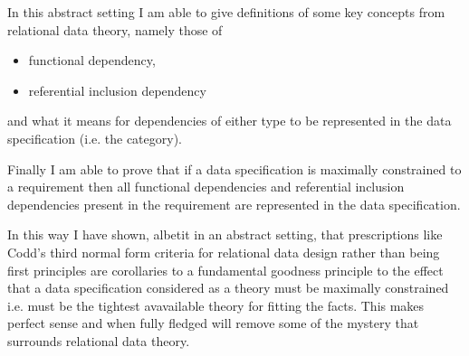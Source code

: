 \documentclass[10pt,a4paper]{article}
\theoremstyle{remark}
\begin{document}
In this abstract setting I am able to give definitions of some key concepts from relational data theory, namely
those of
\begin{itemize}
\item functional dependency,
\item referential inclusion dependency
\end{itemize}
and what it means for dependencies of either type to be represented in the data specification (i.e. the category).

Finally I am able to prove that if a data specification is maximally constrained to a requirement then
all functional dependencies and referential inclusion dependencies present in the requirement are represented in the data
specification.

In this way I have shown,  albetit in an abstract setting, that prescriptions like Codd's third normal form criteria 
for relational data design rather than being first principles are corollaries to a fundamental goodness principle to the effect that a data specification considered as a theory must be maximally constrained i.e. must be the tightest avavailable theory for fitting the facts.
This makes perfect sense and when fully fledged will remove some of the mystery that surrounds  relational data theory. \\
\end{document}
